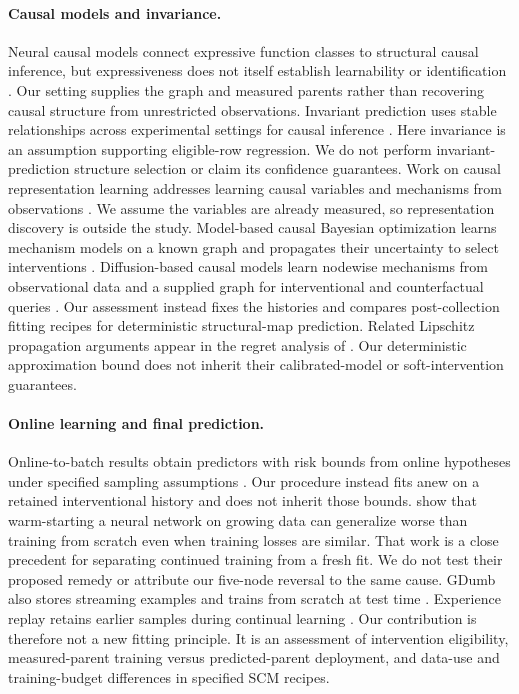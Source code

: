 \paragraph{Causal models and invariance.}
Neural causal models connect expressive function classes to structural causal
inference, but expressiveness does not itself establish learnability or
identification \citep{xia2021causal}. Our setting supplies the graph and measured
parents rather than recovering causal structure from unrestricted observations.
Invariant prediction uses stable relationships across experimental settings
for causal inference \citep{peters2016invariant}. Here invariance is an assumption
supporting eligible-row regression. We do not perform invariant-prediction
structure selection or claim its confidence guarantees. Work on causal
representation learning addresses learning causal variables and mechanisms
from observations \citep{scholkopf2021representation}. We assume the variables
are already measured, so representation discovery is outside the study.
Model-based causal Bayesian optimization learns mechanism models on a known
graph and propagates their uncertainty to select interventions
\citep{sussex2023model}. Diffusion-based causal models learn nodewise mechanisms
from observational data and a supplied graph for interventional and
counterfactual queries \citep{chao2024mechanisms}. Our assessment instead fixes
the histories and compares post-collection fitting recipes for deterministic
structural-map prediction. Related Lipschitz propagation arguments appear in
the regret analysis of \citet{sussex2023model}. Our deterministic approximation
bound does not inherit their calibrated-model or soft-intervention guarantees.

\paragraph{Online learning and final prediction.}
Online-to-batch results obtain predictors with risk bounds from online hypotheses
under specified sampling assumptions \citep{cesabianchi2004generalization}.
Our procedure instead fits anew on a retained interventional history and does
not inherit those bounds. \citet{ash2020warm} show that warm-starting a neural
network on growing data can generalize worse than training from scratch even
when training losses are similar. That work is a close precedent for separating
continued training from a fresh fit. We do not test their proposed remedy or
attribute our five-node reversal to the same cause.
GDumb also stores streaming examples and trains from scratch at test time
\citep{prabhu2020gdumb}. Experience replay retains earlier samples during
continual learning \citep{rolnick2019replay}. Our contribution is therefore not
a new fitting principle. It is an assessment of intervention eligibility,
measured-parent training versus predicted-parent deployment, and data-use and
training-budget differences in specified SCM recipes.

